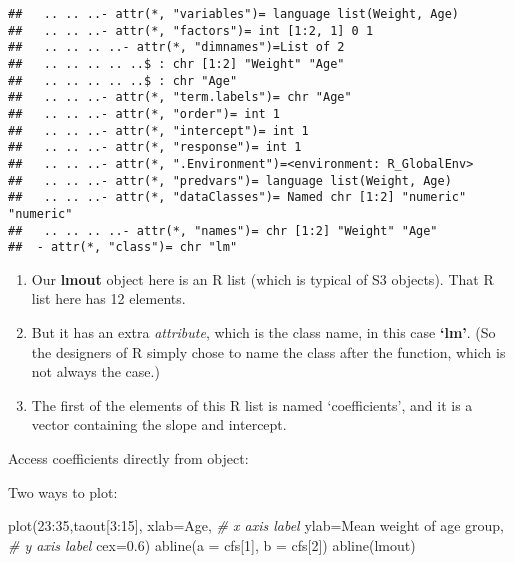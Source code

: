 \documentclass[
]{article}
\newenvironment{Shaded}{\begin{snugshade}}{\end{snugshade}}
\newcommand{\AttributeTok}[1]{\textcolor[rgb]{0.77,0.63,0.00}{#1}}
\newcommand{\CommentTok}[1]{\textcolor[rgb]{0.56,0.35,0.01}{\textit{#1}}}
\newcommand{\DecValTok}[1]{\textcolor[rgb]{0.00,0.00,0.81}{#1}}
\newcommand{\FloatTok}[1]{\textcolor[rgb]{0.00,0.00,0.81}{#1}}
\newcommand{\FunctionTok}[1]{\textcolor[rgb]{0.00,0.00,0.00}{#1}}
\newcommand{\NormalTok}[1]{#1}
\newcommand{\OtherTok}[1]{\textcolor[rgb]{0.56,0.35,0.01}{#1}}
\newcommand{\SpecialCharTok}[1]{\textcolor[rgb]{0.00,0.00,0.00}{#1}}
\newcommand{\StringTok}[1]{\textcolor[rgb]{0.31,0.60,0.02}{#1}}
\begin{document}
\begin{verbatim}
##   .. .. ..- attr(*, "variables")= language list(Weight, Age)
##   .. .. ..- attr(*, "factors")= int [1:2, 1] 0 1
##   .. .. .. ..- attr(*, "dimnames")=List of 2
##   .. .. .. .. ..$ : chr [1:2] "Weight" "Age"
##   .. .. .. .. ..$ : chr "Age"
##   .. .. ..- attr(*, "term.labels")= chr "Age"
##   .. .. ..- attr(*, "order")= int 1
##   .. .. ..- attr(*, "intercept")= int 1
##   .. .. ..- attr(*, "response")= int 1
##   .. .. ..- attr(*, ".Environment")=<environment: R_GlobalEnv> 
##   .. .. ..- attr(*, "predvars")= language list(Weight, Age)
##   .. .. ..- attr(*, "dataClasses")= Named chr [1:2] "numeric" "numeric"
##   .. .. .. ..- attr(*, "names")= chr [1:2] "Weight" "Age"
##  - attr(*, "class")= chr "lm"
\end{verbatim}

\begin{enumerate}
\def\labelenumi{\arabic{enumi}.}
\item
  Our \textbf{lmout} object here is an R list (which is typical of S3
  objects). That R list here has 12 elements.
\item
  But it has an extra \emph{attribute}, which is the class name, in this
  case \textbf{`lm'}. (So the designers of R simply chose to name the
  class after the function, which is not always the case.)
\item
  The first of the elements of this R list is named `coefficients', and
  it is a vector containing the slope and intercept.
\end{enumerate}

Access coefficients directly from object:

\begin{Shaded}
\end{Shaded}

Two ways to plot:

\begin{Shaded}
\begin{Highlighting}[]
\FunctionTok{plot}\NormalTok{(}\DecValTok{23}\SpecialCharTok{:}\DecValTok{35}\NormalTok{,taout[}\DecValTok{3}\SpecialCharTok{:}\DecValTok{15}\NormalTok{],}
     \AttributeTok{xlab=}\StringTok{\textquotesingle{}Age\textquotesingle{}}\NormalTok{,    }\CommentTok{\# x axis label}
     \AttributeTok{ylab=}\StringTok{\textquotesingle{}Mean weight of age group\textquotesingle{}}\NormalTok{,   }\CommentTok{\# y axis label}
     \AttributeTok{cex=}\FloatTok{0.6}\NormalTok{)}
\FunctionTok{abline}\NormalTok{(}\AttributeTok{a =}\NormalTok{ cfs[}\DecValTok{1}\NormalTok{], }\AttributeTok{b =}\NormalTok{ cfs[}\DecValTok{2}\NormalTok{])}
\FunctionTok{abline}\NormalTok{(lmout)}
\end{Highlighting}
\end{Shaded}
\end{document}
